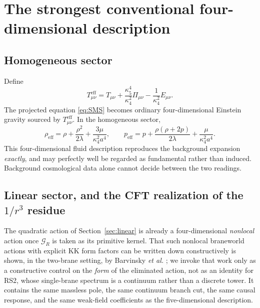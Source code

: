 \documentclass[11pt,a4paper]{article}
\theoremstyle{plain}
\theoremstyle{definition}
\newcommand{\kfive}{\kappa_5}
\newcommand{\kfour}{\kappa_4}
\begin{document}
\section{The strongest conventional four-dimensional description}
\label{sec:fourdim}

\subsection{Homogeneous sector}

Define
\begin{equation}
\label{eq:Teff}
T^{\mathrm{eff}}_{\mu\nu}
=T_{\mu\nu}
+\frac{\kfive^4}{\kfour^2}\Pi_{\mu\nu}
-\frac{1}{\kfour^2}E_{\mu\nu}.
\end{equation}
The projected equation \eqref{eq:SMS} becomes ordinary four-dimensional
Einstein gravity sourced by $T^{\mathrm{eff}}_{\mu\nu}$. In the
homogeneous sector,
\begin{equation}
\label{eq:rhoeff}
\rho_{\mathrm{eff}}
=\rho+\frac{\rho^2}{2\lambda}
+\frac{3\mu}{\kfour^2a^4},
\qquad
p_{\mathrm{eff}}
=p+\frac{\rho(\rho+2p)}{2\lambda}
+\frac{\mu}{\kfour^2a^4}.
\end{equation}
This four-dimensional fluid description reproduces the background
expansion \emph{exactly}, and may perfectly well be regarded as
fundamental rather than induced. Background cosmological data alone
cannot decide between the two readings.

\subsection{\texorpdfstring{Linear sector, and the CFT realization of the $1/r^3$ residue}{Linear sector, and the CFT realization of the 1/r\textthreesuperior{} residue}}

The quadratic action of Section~\ref{sec:linear} is already a
four-dimensional \emph{nonlocal} action once $\mathcal G_R$ is taken as
its primitive kernel. That such nonlocal braneworld actions with explicit
KK form factors can be written down constructively is shown, in the
two-brane setting, by Barvinsky \emph{et al.} \cite{Barvinsky}; we invoke
that work only as a constructive control on the \emph{form} of the
eliminated action, not as an identity for RS2, whose single-brane
spectrum is a continuum rather than a discrete tower. It contains the same massless pole, the same
continuum branch cut, the same causal response, and the same weak-field
coefficients as the five-dimensional description.
\end{document}
